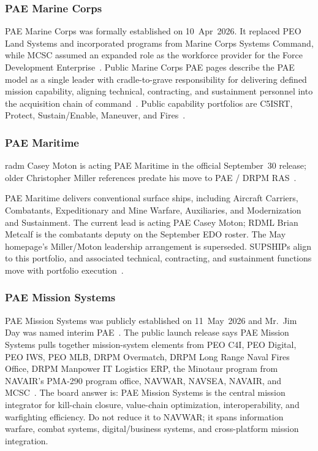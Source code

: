\documentclass[../main.tex]{subfiles}
\begin{document}
\subsubsection{PAE Marine Corps}
PAE Marine Corps was formally established on 10~Apr~2026. It replaced PEO Land Systems and incorporated programs from Marine Corps Systems Command, while MCSC assumed an expanded role as the workforce provider for the Force Development Enterprise~\autocite{PAE-Marine-Corps-Establishment-2026}. Public Marine Corps PAE pages describe the PAE model as a single leader with cradle-to-grave responsibility for delivering defined mission capability, aligning technical, contracting, and sustainment personnel into the acquisition chain of command~\autocite{PAE-Marine-Corps-About-2026}. Public capability portfolios are C5ISRT, Protect, Sustain/Enable, Maneuver, and Fires~\autocite{PAE-Marine-Corps-Organization-2026}.

\subsubsection{PAE Maritime}
\ac{radm} Casey Moton is acting PAE Maritime in the official September~30 release; older Christopher Miller references predate his move to PAE / DRPM RAS~\autocite{PAE-Maritime-Moton-Sep2026,DON-DRPM-RAS-Aug2026}.

PAE Maritime delivers conventional surface ships, including Aircraft Carriers, Combatants, Expeditionary and Mine Warfare, Auxiliaries, and Modernization and Sustainment. The current lead is acting PAE Casey Moton; RDML Brian Metcalf is the combatants deputy on the September EDO roster. The May homepage's Miller/Moton leadership arrangement is superseded. SUPSHIPs align to this portfolio, and associated technical, contracting, and sustainment functions move with portfolio execution~\autocite{PAE-Maritime-Moton-Sep2026,edo-2-1-1-command-structures-2025,edo-2-1-2-navsea-organization-2025,DON-PAE-Expansion-May2026}.

\subsubsection{PAE Mission Systems}
PAE Mission Systems was publicly established on 11~May~2026 and Mr.\ Jim Day was named interim PAE~\autocite{DON-PAE-Expansion-May2026,DON-PAE-Mission-Systems-2026}. The public launch release says PAE Mission Systems pulls together mission-system elements from PEO C4I, PEO Digital, PEO IWS, PEO MLB, DRPM Overmatch, DRPM Long Range Naval Fires Office, DRPM Manpower IT Logistics ERP, the Minotaur program from NAVAIR's PMA-290 program office, NAVWAR, NAVSEA, NAVAIR, and MCSC~\autocite{DON-PAE-Mission-Systems-2026}. The board answer is: PAE Mission Systems is the central mission integrator for kill-chain closure, value-chain optimization, interoperability, and warfighting efficiency. Do not reduce it to NAVWAR; it spans information warfare, combat systems, digital/business systems, and cross-platform mission integration.
\end{document}
